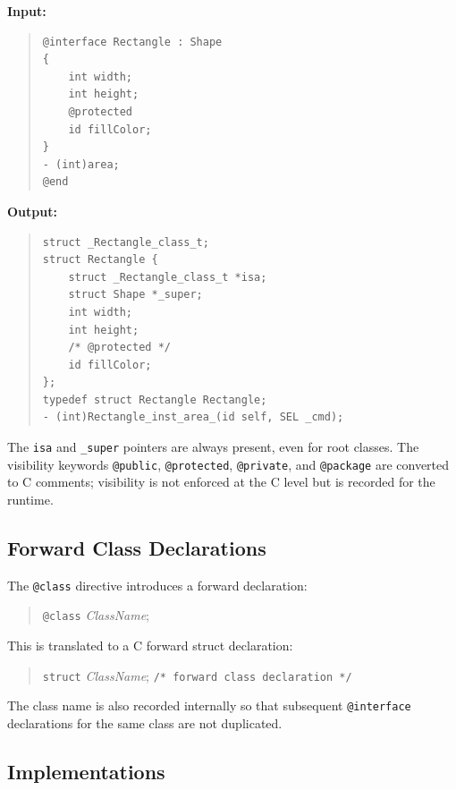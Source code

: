 \documentclass[11pt,twoside]{article}
\newcommand{\meta}[1]{{\itshape #1}}
\begin{document}
{\bf Input:}
\begin{quote}
\begin{verbatim}
@interface Rectangle : Shape
{
    int width;
    int height;
    @protected
    id fillColor;
}
- (int)area;
@end
\end{verbatim}
\end{quote}

{\bf Output:}
\begin{quote}
\begin{verbatim}
struct _Rectangle_class_t;
struct Rectangle {
    struct _Rectangle_class_t *isa;
    struct Shape *_super;
    int width;
    int height;
    /* @protected */
    id fillColor;
};
typedef struct Rectangle Rectangle;
- (int)Rectangle_inst_area_(id self, SEL _cmd);
\end{verbatim}
\end{quote}

The {\tt isa} and {\tt \_super} pointers are always present, even for
root classes.  The visibility keywords {\tt @public}, {\tt @protected},
{\tt @private}, and {\tt @package} are converted to C comments;
visibility is not enforced at the C level but is recorded for the
runtime.

\subsection{Forward Class Declarations}

The {\tt @class} directive introduces a forward declaration:
\begin{quote}
{\tt @class} {\meta{ClassName}};
\end{quote}

This is translated to a C forward struct declaration:
\begin{quote}
{\tt struct} {\meta{ClassName}}; \hfill {\tt /* forward class declaration */}
\end{quote}

The class name is also recorded internally so that subsequent
{\tt @interface} declarations for the same class are not duplicated.

\subsection{Implementations}
\end{document}
